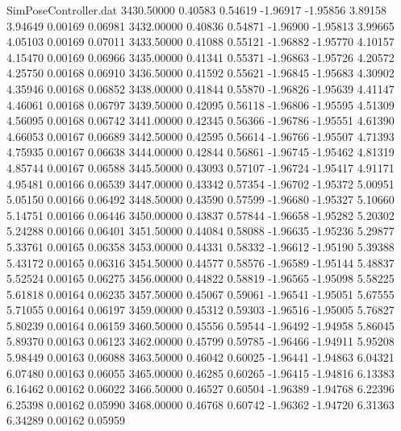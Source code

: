 \begin{filecontents}{SimPoseController.dat}
3430.50000    0.40583    0.54619    -1.96917   -1.95856    3.89158    3.94649    0.00169    0.06981
3432.00000    0.40836    0.54871    -1.96900   -1.95813    3.99665    4.05103    0.00169    0.07011
3433.50000    0.41088    0.55121    -1.96882   -1.95770    4.10157    4.15470    0.00169    0.06966
3435.00000    0.41341    0.55371    -1.96863   -1.95726    4.20572    4.25750    0.00168    0.06910
3436.50000    0.41592    0.55621    -1.96845   -1.95683    4.30902    4.35946    0.00168    0.06852
3438.00000    0.41844    0.55870    -1.96826   -1.95639    4.41147    4.46061    0.00168    0.06797
3439.50000    0.42095    0.56118    -1.96806   -1.95595    4.51309    4.56095    0.00168    0.06742
3441.00000    0.42345    0.56366    -1.96786   -1.95551    4.61390    4.66053    0.00167    0.06689
3442.50000    0.42595    0.56614    -1.96766   -1.95507    4.71393    4.75935    0.00167    0.06638
3444.00000    0.42844    0.56861    -1.96745   -1.95462    4.81319    4.85744    0.00167    0.06588
3445.50000    0.43093    0.57107    -1.96724   -1.95417    4.91171    4.95481    0.00166    0.06539
3447.00000    0.43342    0.57354    -1.96702   -1.95372    5.00951    5.05150    0.00166    0.06492
3448.50000    0.43590    0.57599    -1.96680   -1.95327    5.10660    5.14751    0.00166    0.06446
3450.00000    0.43837    0.57844    -1.96658   -1.95282    5.20302    5.24288    0.00166    0.06401
3451.50000    0.44084    0.58088    -1.96635   -1.95236    5.29877    5.33761    0.00165    0.06358
3453.00000    0.44331    0.58332    -1.96612   -1.95190    5.39388    5.43172    0.00165    0.06316
3454.50000    0.44577    0.58576    -1.96589   -1.95144    5.48837    5.52524    0.00165    0.06275
3456.00000    0.44822    0.58819    -1.96565   -1.95098    5.58225    5.61818    0.00164    0.06235
3457.50000    0.45067    0.59061    -1.96541   -1.95051    5.67555    5.71055    0.00164    0.06197
3459.00000    0.45312    0.59303    -1.96516   -1.95005    5.76827    5.80239    0.00164    0.06159
3460.50000    0.45556    0.59544    -1.96492   -1.94958    5.86045    5.89370    0.00163    0.06123
3462.00000    0.45799    0.59785    -1.96466   -1.94911    5.95208    5.98449    0.00163    0.06088
3463.50000    0.46042    0.60025    -1.96441   -1.94863    6.04321    6.07480    0.00163    0.06055
3465.00000    0.46285    0.60265    -1.96415   -1.94816    6.13383    6.16462    0.00162    0.06022
3466.50000    0.46527    0.60504    -1.96389   -1.94768    6.22396    6.25398    0.00162    0.05990
3468.00000    0.46768    0.60742    -1.96362   -1.94720    6.31363    6.34289    0.00162    0.05959

\end{filecontents}
